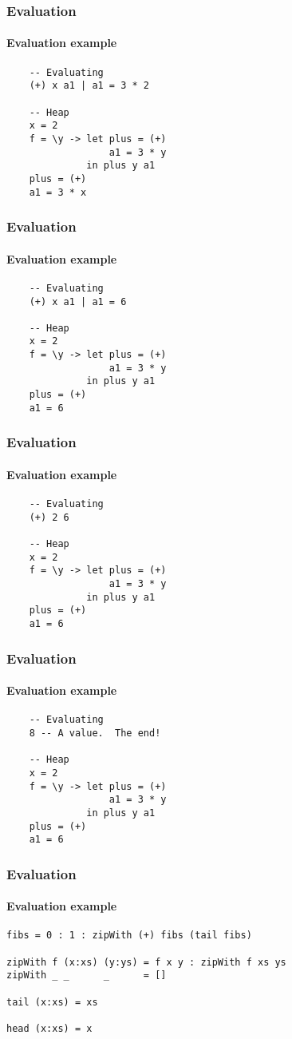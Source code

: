 \documentclass{beamer}
\begin{document}
\begin{frame}[fragile]
\frametitle{Evaluation}
\framesubtitle{Evaluation example}

\begin{verbatim}
    -- Evaluating
    (+) x a1 | a1 = 3 * 2

    -- Heap
    x = 2
    f = \y -> let plus = (+)
                  a1 = 3 * y
              in plus y a1
    plus = (+)
    a1 = 3 * x
\end{verbatim}
\end{frame}

\begin{frame}[fragile]
\frametitle{Evaluation}
\framesubtitle{Evaluation example}

\begin{verbatim}
    -- Evaluating
    (+) x a1 | a1 = 6

    -- Heap
    x = 2
    f = \y -> let plus = (+)
                  a1 = 3 * y
              in plus y a1
    plus = (+)
    a1 = 6
\end{verbatim}
\end{frame}

\begin{frame}[fragile]
\frametitle{Evaluation}
\framesubtitle{Evaluation example}

\begin{verbatim}
    -- Evaluating
    (+) 2 6

    -- Heap
    x = 2
    f = \y -> let plus = (+)
                  a1 = 3 * y
              in plus y a1
    plus = (+)
    a1 = 6
\end{verbatim}
\end{frame}

\begin{frame}[fragile]
\frametitle{Evaluation}
\framesubtitle{Evaluation example}

\begin{verbatim}
    -- Evaluating
    8 -- A value.  The end!

    -- Heap
    x = 2
    f = \y -> let plus = (+)
                  a1 = 3 * y
              in plus y a1
    plus = (+)
    a1 = 6
\end{verbatim}
\end{frame}

\begin{frame}[fragile]
\frametitle{Evaluation}
\framesubtitle{Evaluation example}

\begin{verbatim}
fibs = 0 : 1 : zipWith (+) fibs (tail fibs)

zipWith f (x:xs) (y:ys) = f x y : zipWith f xs ys
zipWith _ _      _      = []

tail (x:xs) = xs

head (x:xs) = x
\end{verbatim}
\end{frame}
\end{document}
